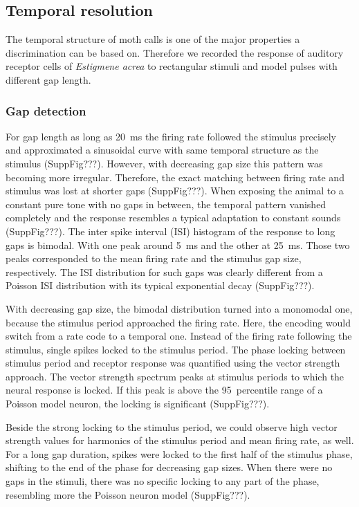 \documentclass[12pt,a4paper,pdftex]{article}
\newcommand{\species}[1]{\textit{#1}}
\begin{document}
\subsection*{Temporal resolution}
The temporal structure of moth calls is one of the major properties a discrimination can be based on. Therefore we recorded the response of auditory receptor cells of \species{Estigmene acrea} to rectangular stimuli and model pulses with different gap length.

\subsubsection*{Gap detection}
For gap length as long as 20~ms the firing rate followed the stimulus precisely and approximated a sinusoidal curve with same temporal structure as the stimulus (SuppFig???). However, with decreasing gap size this pattern was becoming more irregular. Therefore, the exact matching between firing rate and stimulus was lost at shorter gaps (SuppFig???). 
When exposing the animal to a constant pure tone with no gaps in between, the temporal pattern vanished completely and the response resembles a typical adaptation to constant sounds (SuppFig???).
The inter spike interval (ISI) histogram of the response to long gaps is bimodal. With one peak around 5~ms and the other at 25~ms. Those two peaks corresponded to the mean firing rate and the stimulus gap size, respectively. The ISI distribution for such gaps was clearly different from a Poisson ISI distribution with its typical exponential decay (SuppFig???). 

With decreasing gap size, the bimodal distribution turned into a monomodal one, because the stimulus period approached the firing rate. Here, the encoding would switch from a rate code to a temporal one. Instead of the firing rate following the stimulus, single spikes locked to the stimulus period. The phase locking between stimulus period and receptor response was quantified using the vector strength approach. The vector strength spectrum peaks at stimulus periods to which the neural response is locked. If this peak is above the 95~percentile range of a Poisson model neuron, the locking is significant (SuppFig???). 

Beside the strong locking to the stimulus period, we could observe high vector strength values for harmonics of the stimulus period and mean firing rate, as well. For a long gap duration, spikes were locked to the first half of the stimulus phase, shifting to the end of the phase for decreasing gap sizes. When there were no gaps in the stimuli, there was no specific locking to any part of the phase, resembling more the Poisson neuron model (SuppFig???).
\end{document}
